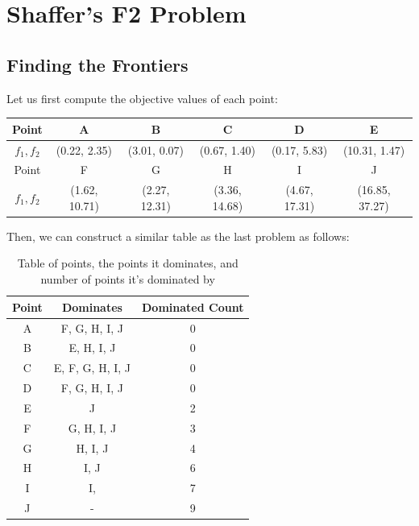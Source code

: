 \section{Shaffer's F2 Problem}

\subsection{Finding the Frontiers}

Let us first compute the objective values of each point:
\begin{table}[ht]
    \centering
    \begin{tabular}{cccccc}
        \toprule
        Point & A & B & C & D & E \\
        \midrule
        \(f_1, f_2\) & (0.22, 2.35) & (3.01, 0.07) & (0.67, 1.40) & (0.17, 5.83) & (10.31, 1.47) \\
        \toprule
        Point & F & G & H & I & J \\
        \midrule
        \(f_1, f_2\) & (1.62, 10.71) & (2.27, 12.31) & (3.36, 14.68) & (4.67, 17.31) & (16.85, 37.27) \\
        \bottomrule
    \end{tabular}
\end{table}

Then, we can construct a similar table as the last problem as follows:

\begin{table}[ht]
    \centering
    \caption{Table of points, the points it dominates, and number of points it's dominated by}
    \begin{tabular}{ccc}
        \toprule
        \textbf{Point} & \textbf{Dominates} & \textbf{Dominated Count} \\
        \midrule
        A & F, G, H, I, J & 0 \\
        B & E, H, I, J & 0 \\
        C & E, F, G, H, I, J & 0 \\
        D & F, G, H, I, J & 0\\
        E & J & 2 \\
        F & G, H, I, J & 3 \\
        G & H, I, J & 4 \\
        H & I, J & 6 \\
        I & I, & 7 \\
        J & - & 9 \\
        \bottomrule
    \end{tabular}
\end{table}

